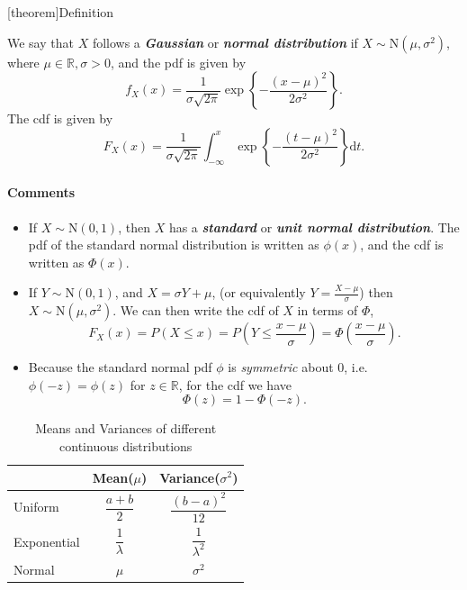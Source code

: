 \documentclass[12pt]{report}
\theoremstyle{definition}
\begin{document}
[theorem]{Definition}
\begin{normal distribution}
    We say that $X$ follows a \textbf{\emph{Gaussian}} or \textbf{\emph{normal
    distribution}} if $X\sim\text{N}(\mu,\sigma^{2})$, where
    $\mu\in\mathbb{R},\sigma>0$, and the pdf is given by
    \[
        f_X(x)=\frac{1}{\sigma\sqrt{2\pi}}\exp\left\{-\frac{{(x-\mu)}^{2}}{2\sigma^{2}}\right\}.
    \]
    The cdf is given by
    \[
        F_X(x)=\frac{1}{\sigma\sqrt{2\pi}}\int_{-\infty}^{x}
        \exp\left\{-\frac{{(t-\mu)}^{2}}{2\sigma^{2}}\right\}\mathrm{d}t.
    \]
\end{normal distribution}
\paragraph{Comments}
\begin{itemize}
    \item If $X\sim\text{N}(0,1)$, then $X$ has a \textbf{\emph{standard}} or
        \textbf{\emph{unit normal distribution}}. The pdf of the standard normal
        distribution is written as $\phi(x)$, and the cdf is written as
        $\Phi(x)$.
    \item If $Y\sim\text{N}(0,1)$, and $X=\sigma Y+\mu$, (or equivalently
        $Y=\frac{X-\mu}{\sigma}$) then $X\sim\text{N}(\mu,\sigma^{2})$.
        We can then write the cdf of $X$ in terms of $\Phi$,
        \[
            F_X(x)=P(X\le x)=P\left(Y\le \frac{x-\mu}{\sigma}\right)
            =\Phi\left(\frac{x-\mu}{\sigma}\right).
        \]
    \item Because the standard normal pdf $\phi$ is \emph{symmetric} about 0,
        i.e.\ $\phi(-z)=\phi(z)$ for $z\in\mathbb{R}$, for the cdf we have
        \[
            \Phi(z)=1-\Phi(-z).
        \]
\end{itemize} 

\begin{table}[h]
    \centering
    \caption{Means and Variances of different continuous distributions}
    \label{mean_var_of_continuous_distributions}
    \def\arraystretch{2.3}
    \begin{tabular}{l||c|c}
        & Mean($\mu$) & Variance($\sigma^{2}$) \\
        \hline\hline
        Uniform & $\dfrac{a+b}{2}$ & $\dfrac{{(b-a)}^{2}}{12}$ \\
        Exponential & $\dfrac{1}{\lambda}$ & $\dfrac{1}{\lambda^{2}}$ \\
        Normal & $\mu$ & $\sigma^2$
    \end{tabular}
\end{table}
\end{document}
